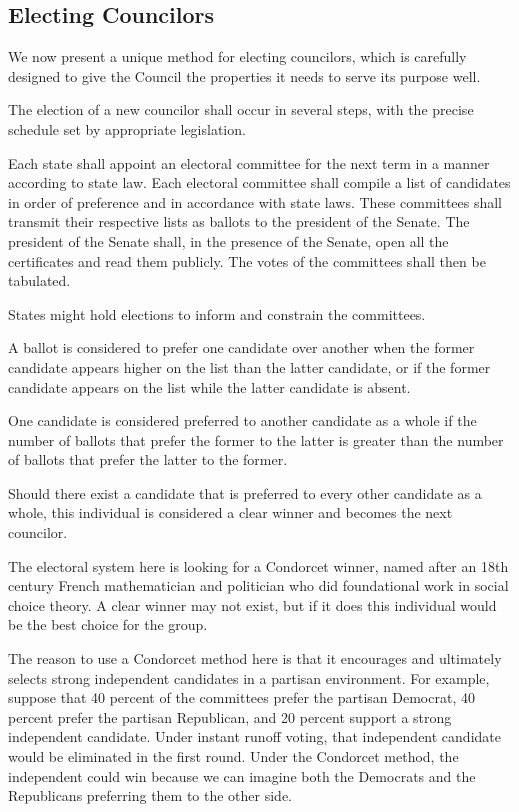 \documentclass{article}
\begin{document}
\subsection{Electing Councilors}

We now present a unique method for electing councilors, which is carefully designed to give the Council the properties it needs to serve its purpose well.

\begin{quoting}
The election of a new councilor shall occur in several steps, with the precise schedule set by appropriate legislation.

Each state shall appoint an electoral committee for the next term in a manner according to state law. Each electoral committee shall compile a list of candidates in order of preference and in accordance with state laws. These committees shall transmit their respective lists as ballots to the president of the Senate.  The president of the Senate shall, in the presence of the Senate, open all the certificates and read them publicly. The votes of the committees shall then be tabulated.
\end{quoting}

States might hold elections to inform and constrain the committees.

\begin{quoting}
A ballot is considered to prefer one candidate over another when the former candidate appears higher on the list than the latter candidate, or if the former candidate appears on the list while the latter candidate is absent.

One candidate is considered preferred to another candidate as a whole if the number of ballots that prefer the former to the latter is greater than the number of ballots that prefer the latter to the former.

Should there exist a candidate that is preferred to every other candidate as a whole, this individual is considered a clear winner and becomes the next councilor.
\end{quoting}

The electoral system here is looking for a Condorcet winner, named after an 18th century French mathematician and politician who did foundational work in social choice theory. A clear  winner may not exist, but if it does this individual would be the best choice for the group.

The reason to use a Condorcet method here is that it encourages and ultimately selects strong independent candidates in a partisan environment. For example, suppose that 40 percent of the committees prefer the partisan Democrat, 40 percent prefer the partisan Republican, and 20 percent support a strong independent candidate. Under instant runoff voting, that independent candidate would be eliminated in the first round. Under the Condorcet method, the independent could win because we can imagine both the Democrats and the Republicans preferring them to the other side.
\end{document}

